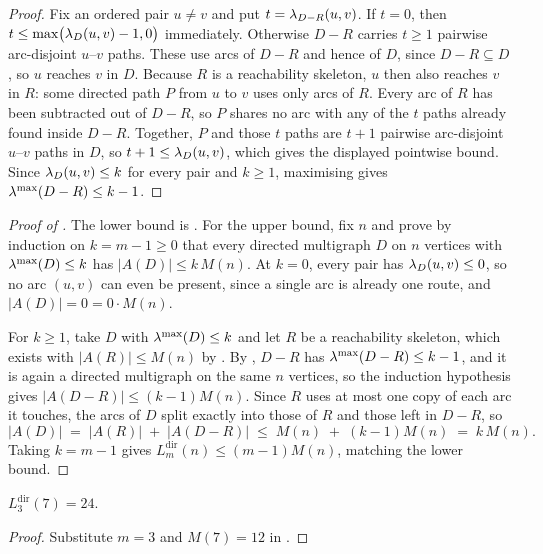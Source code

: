 \begin{proof}
Fix an ordered pair $u \ne v$ and put $t = \lambda_{D-R}(u,v)$. If $t = 0$, then
$t \le \max\bigl(\lambda_D(u,v)-1,0\bigr)$ immediately. Otherwise $D-R$ carries $t \ge 1$
pairwise arc-disjoint $u$--$v$ paths. These use arcs of $D - R$ and hence of
$D$, since $D - R \subseteq D$, so $u$ reaches $v$ in $D$. Because $R$ is a
reachability skeleton, $u$ then also reaches $v$ in $R$: some directed path
$P$ from $u$ to $v$ uses only arcs of $R$. Every arc of $R$ has been
subtracted out of $D - R$, so $P$ shares no arc with any of the $t$ paths
already found inside $D - R$. Together, $P$ and those $t$ paths are $t+1$
pairwise arc-disjoint $u$--$v$ paths in $D$, so
$t + 1 \le \lambda_D(u,v)$, which gives the displayed pointwise bound. Since
$\lambda_D(u,v) \le k$ for every pair and $k \ge 1$, maximising gives
$\lambda^{\max}(D-R) \le k-1$.
\end{proof}

\begin{proof}[Proof of ]
The lower bound is . For the upper bound, fix $n$ and prove by induction on $k = m-1 \ge 0$ that every directed multigraph $D$ on $n$ vertices with $\lambda^{\max}(D) \le k$ has $|A(D)| \le k\,M(n)$. At $k=0$, every pair has $\lambda_D(u,v) \le 0$, so no arc $(u,v)$ can even be present, since a single arc is already one route, and $|A(D)| = 0 = 0 \cdot M(n)$.

For $k \ge 1$, take $D$ with $\lambda^{\max}(D) \le k$ and let $R$ be a reachability skeleton, which exists with $|A(R)| \le M(n)$ by . By , $D - R$ has $\lambda^{\max}(D-R) \le k-1$, and it is again a directed multigraph on the same $n$ vertices, so the induction hypothesis gives $|A(D-R)| \le (k-1)M(n)$. Since $R$ uses at most one copy of each arc it touches, the arcs of $D$ split exactly into those of $R$ and those left in $D-R$, so
\[
    |A(D)| \;=\; |A(R)| \;+\; |A(D-R)| \;\le\; M(n) \;+\; (k-1)M(n) \;=\; k\,M(n).
\]
Taking $k = m-1$ gives $L_m^{\mathrm{dir}}(n) \le (m-1)M(n)$, matching the lower bound.
\end{proof}

\begin{corollary}[The directed multigraph value at $n = 7$, $m = 3$]\label{cor:dir-multi-n7}
$L_3^{\mathrm{dir}}(7) = 24$.
\end{corollary}

\begin{proof}
Substitute $m=3$ and $M(7)=12$ in .
\end{proof}

